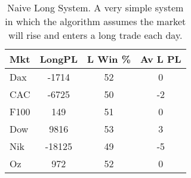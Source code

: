\begin{table}[ht]
\centering
\caption[Naive Long System]{Naive Long System. A very simple system in which the algorithm assumes the market will rise and enters a long trade each day.} 
\label{tab:nlng_results}
\begin{tabular}{lccc}
  \toprule Mkt & LongPL & L Win \% & Av L PL \\ 
  \midrule Dax & -1714 & 52 & 0 \\ 
  CAC & -6725 & 50 & -2 \\ 
  F100 & 149 & 51 & 0 \\ 
  Dow & 9816 & 53 & 3 \\ 
  Nik & -18125 & 49 & -5 \\ 
  Oz & 972 & 52 & 0 \\ 
   \bottomrule \end{tabular}
\end{table}
